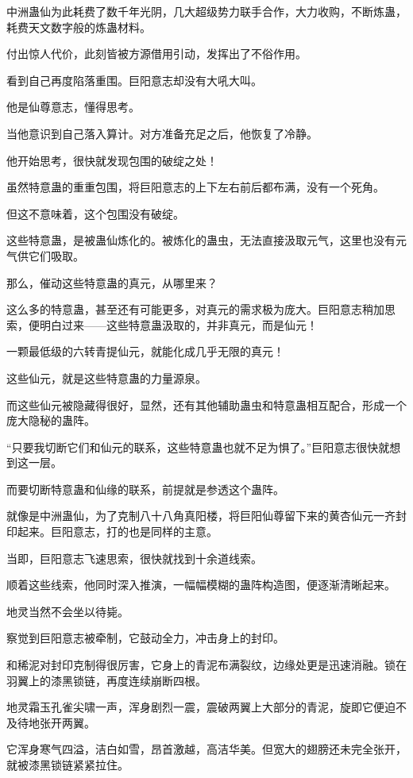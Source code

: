 \begin{this_body}
中洲蛊仙为此耗费了数千年光阴，几大超级势力联手合作，大力收购，不断炼蛊，耗费天文数字般的炼蛊材料。

付出惊人代价，此刻皆被方源借用引动，发挥出了不俗作用。

看到自己再度陷落重围。巨阳意志却没有大吼大叫。

他是仙尊意志，懂得思考。

当他意识到自己落入算计。对方准备充足之后，他恢复了冷静。

他开始思考，很快就发现包围的破绽之处！

虽然特意蛊的重重包围，将巨阳意志的上下左右前后都布满，没有一个死角。

但这不意味着，这个包围没有破绽。

这些特意蛊，是被蛊仙炼化的。被炼化的蛊虫，无法直接汲取元气，这里也没有元气供它们吸取。

那么，催动这些特意蛊的真元，从哪里来？

这么多的特意蛊，甚至还有可能更多，对真元的需求极为庞大。巨阳意志稍加思索，便明白过来——这些特意蛊汲取的，并非真元，而是仙元！

一颗最低级的六转青提仙元，就能化成几乎无限的真元！

这些仙元，就是这些特意蛊的力量源泉。

而这些仙元被隐藏得很好，显然，还有其他辅助蛊虫和特意蛊相互配合，形成一个庞大隐秘的蛊阵。

“只要我切断它们和仙元的联系，这些特意蛊也就不足为惧了。”巨阳意志很快就想到这一层。

而要切断特意蛊和仙缘的联系，前提就是参透这个蛊阵。

就像是中洲蛊仙，为了克制八十八角真阳楼，将巨阳仙尊留下来的黄杏仙元一齐封印起来。巨阳意志，打的也是同样的主意。

当即，巨阳意志飞速思索，很快就找到十余道线索。

顺着这些线索，他同时深入推演，一幅幅模糊的蛊阵构造图，便逐渐清晰起来。

地灵当然不会坐以待毙。

察觉到巨阳意志被牵制，它鼓动全力，冲击身上的封印。

和稀泥对封印克制得很厉害，它身上的青泥布满裂纹，边缘处更是迅速消融。锁在羽翼上的漆黑锁链，再度连续崩断四根。

地灵霜玉孔雀尖啸一声，浑身剧烈一震，震破两翼上大部分的青泥，旋即它便迫不及待地张开两翼。

它浑身寒气四溢，洁白如雪，昂首激越，高洁华美。但宽大的翅膀还未完全张开，就被漆黑锁链紧紧拉住。


\end{this_body}
